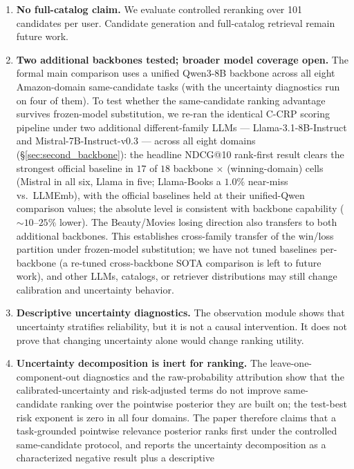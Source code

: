 \begin{enumerate}
    \item \textbf{No full-catalog claim.} We evaluate controlled reranking over
    101 candidates per user. Candidate generation and full-catalog retrieval
    remain future work.
    \item \textbf{Two additional backbones tested; broader model coverage open.}
    The formal main comparison uses a unified Qwen3-8B backbone across all eight
    Amazon-domain same-candidate tasks (with the uncertainty diagnostics run on
    four of them). To test whether the same-candidate ranking advantage survives
    frozen-model substitution, we re-ran the identical C-CRP scoring pipeline
    under two additional different-family LLMs --- Llama-3.1-8B-Instruct and
    Mistral-7B-Instruct-v0.3 --- across all eight domains
    (\S\ref{sec:second_backbone}): the headline NDCG@10 rank-first result clears
    the strongest official baseline in $17$ of $18$
    backbone$\,\times\,$(winning-domain) cells (Mistral in all six, Llama in five;
    Llama-Books a $1.0\%$ near-miss vs.\ LLMEmb), with the official baselines held
    at their unified-Qwen comparison values; the absolute level is consistent with
    backbone capability ($\sim 10$--$25\%$ lower). The Beauty/Movies losing
    direction also transfers to both additional backbones. This establishes
    cross-family transfer of the win/loss partition under frozen-model
    substitution; we have not tuned baselines per-backbone (a re-tuned
    cross-backbone SOTA comparison is left to future work), and other LLMs,
    catalogs, or retriever distributions may still change calibration and
    uncertainty behavior.
    \item \textbf{Descriptive uncertainty diagnostics.} The observation module
    shows that uncertainty stratifies reliability, but it is not a causal
    intervention. It does not prove that changing uncertainty alone would change
    ranking utility.
    \item \textbf{Uncertainty decomposition is inert for ranking.} The
    leave-one-component-out diagnostics and the raw-probability attribution show
    that the calibrated-uncertainty and risk-adjusted terms do not improve
    same-candidate ranking over the pointwise posterior they are built on; the
    test-best risk exponent is zero in all four domains. The paper therefore
    claims that a task-grounded pointwise relevance posterior ranks first under
    the controlled same-candidate protocol, and reports the uncertainty
    decomposition as a characterized negative result plus a descriptive

\end{enumerate}
